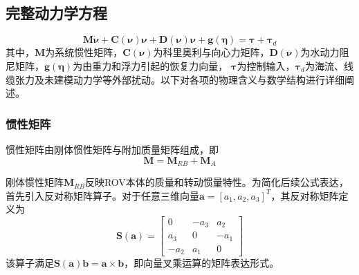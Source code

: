 \subsection{完整动力学方程}



\begin{equation}
    \boldsymbol{M}\dot{\boldsymbol{\nu}}
    +\boldsymbol{C}(\boldsymbol{\nu})\boldsymbol{\nu}
    +\boldsymbol{D}(\boldsymbol{\nu})\boldsymbol{\nu}
    +\boldsymbol{g}(\boldsymbol{\eta})
    =
    \boldsymbol{\tau}
    +\boldsymbol{\tau}_{d}
    \label{eq:fossen_model}
\end{equation}
其中，$\boldsymbol{M}$为系统惯性矩阵，$\boldsymbol{C}(\boldsymbol{\nu})$为科里奥利与向心力矩阵，$\boldsymbol{D}(\boldsymbol{\nu})$为水动力阻尼矩阵，$\boldsymbol{g}(\boldsymbol{\eta})$为由重力和浮力引起的恢复力向量，
$\boldsymbol{\tau}$为控制输入，$\boldsymbol{\tau}_{d}$为海流、线缆张力及未建模动力学等外部扰动。以下对各项的物理含义与数学结构进行详细阐述。

\subsubsection{惯性矩阵}

惯性矩阵由刚体惯性矩阵与附加质量矩阵组成，即
\begin{equation}
    \boldsymbol{M}=\boldsymbol{M}_{RB}+\boldsymbol{M}_{A}
\end{equation}

刚体惯性矩阵$\boldsymbol{M}_{RB}$反映ROV本体的质量和转动惯量特性。为简化后续公式表达，首先引入反对称矩阵算子。对于任意三维向量$\boldsymbol{a}=[a_1,a_2,a_3]^T$，其反对称矩阵定义为
\begin{equation}
    \boldsymbol{S}(\boldsymbol{a})=
    \begin{bmatrix}
        0 & -a_3 & a_2 \\
        a_3 & 0 & -a_1 \\
        -a_2 & a_1 & 0
    \end{bmatrix}
    \label{eq:skew_symmetric}
\end{equation}
该算子满足$\boldsymbol{S}(\boldsymbol{a})\boldsymbol{b}=\boldsymbol{a}\times\boldsymbol{b}$，即向量叉乘运算的矩阵表达形式。

